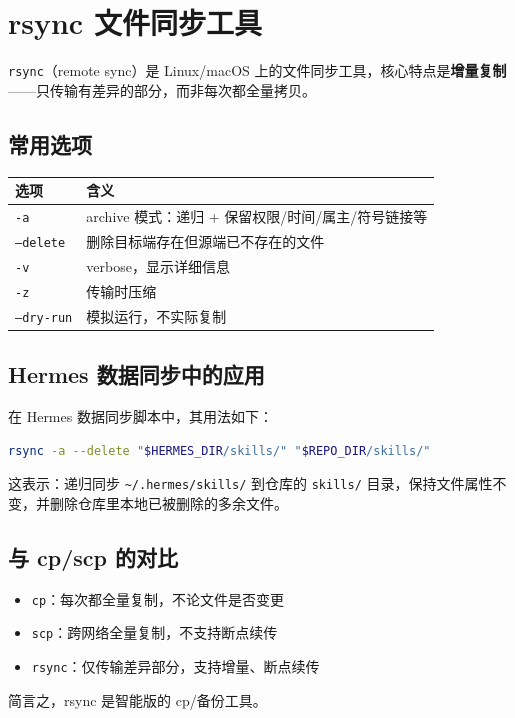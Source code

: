 \section{rsync 文件同步工具}
\label{sec:rsync}

\texttt{rsync}（remote sync）是 Linux/macOS 上的文件同步工具，核心特点是\textbf{增量复制}——只传输有差异的部分，而非每次都全量拷贝。

\subsection{常用选项}

\begin{longtable}{ll}
\toprule
\textbf{选项} & \textbf{含义} \\
\midrule
\endhead
\texttt{-a} & archive 模式：递归 + 保留权限/时间/属主/符号链接等 \\
\texttt{--delete} & 删除目标端存在但源端已不存在的文件 \\
\texttt{-v} & verbose，显示详细信息 \\
\texttt{-z} & 传输时压缩 \\
\texttt{--dry-run} & 模拟运行，不实际复制 \\
\bottomrule
\end{longtable}

\subsection{Hermes 数据同步中的应用}

在 Hermes 数据同步脚本中，其用法如下：

\begin{lstlisting}[language=bash]
rsync -a --delete "$HERMES_DIR/skills/" "$REPO_DIR/skills/"
\end{lstlisting}

这表示：递归同步 \texttt{\textasciitilde/.hermes/skills/} 到仓库的 \texttt{skills/} 目录，保持文件属性不变，并删除仓库里本地已被删除的多余文件。

\subsection{与 cp/scp 的对比}

\begin{itemize}
  \item \texttt{cp}：每次都全量复制，不论文件是否变更
  \item \texttt{scp}：跨网络全量复制，不支持断点续传
  \item \texttt{rsync}：仅传输差异部分，支持增量、断点续传
\end{itemize}

简言之，rsync 是智能版的 cp/备份工具。
